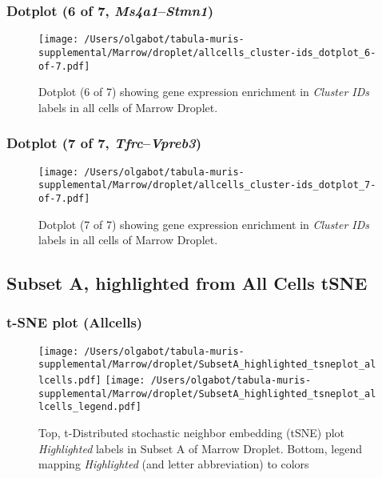 \clearpage

\subsubsection{Dotplot (6 of 7, \emph{Ms4a1}--\emph{Stmn1})}
\begin{figure}[h]
\centering
\texttt{[image: /Users/olgabot/tabula-muris-supplemental/Marrow/droplet/allcells\_cluster-ids\_dotplot\_6-of-7.pdf]}

\caption{ Dotplot (6 of 7)  showing gene expression enrichment in \emph{Cluster IDs} labels in all cells of Marrow Droplet. }
\end{figure}


\clearpage

\subsubsection{Dotplot (7 of 7, \emph{Tfrc}--\emph{Vpreb3})}
\begin{figure}[h]
\centering
\texttt{[image: /Users/olgabot/tabula-muris-supplemental/Marrow/droplet/allcells\_cluster-ids\_dotplot\_7-of-7.pdf]}

\caption{ Dotplot (7 of 7)  showing gene expression enrichment in \emph{Cluster IDs} labels in all cells of Marrow Droplet. }
\end{figure}


\clearpage
\subsection{Subset A, highlighted from All Cells tSNE}
\subsubsection{t-SNE plot (Allcells)}
\begin{figure}[h]
\centering
\texttt{[image: /Users/olgabot/tabula-muris-supplemental/Marrow/droplet/SubsetA\_highlighted\_tsneplot\_allcells.pdf]}
\texttt{[image: /Users/olgabot/tabula-muris-supplemental/Marrow/droplet/SubsetA\_highlighted\_tsneplot\_allcells\_legend.pdf]}
\caption{Top, t-Distributed stochastic neighbor embedding (tSNE) plot  \emph{Highlighted} labels in Subset A of Marrow Droplet. Bottom, legend mapping \emph{Highlighted} (and letter abbreviation) to colors}
\end{figure}


\clearpage

